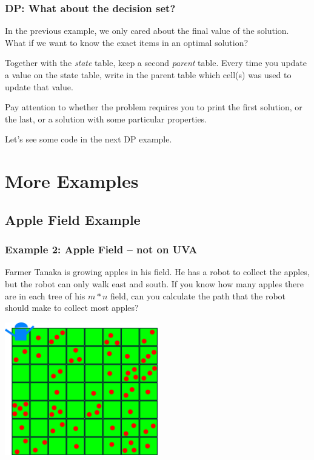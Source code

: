 \documentclass{beamer}
\begin{document}
\begin{frame}
  \frametitle{DP: What about the decision set?}  

  \begin{block}{}
  In the previous example, we only cared about the final value of the
  solution. What if we want to know the exact items in an optimal
  solution?
  \end{block}

  \medskip
  
  Together with the \emph{state} table, keep a second \emph{parent} table. 
  Every time you update a value on the state table, write in the parent table 
  which cell(s) was used to update that value.

  \medskip

  Pay attention to whether the problem requires you to print the first
  solution, or the last, or a solution with some particular
  properties.

  \bigskip

  Let's see some code in the next DP example.
\end{frame}



\section{More Examples}
\subsection{Apple Field Example}
\begin{frame}
  \frametitle{Example 2: Apple Field -- not on UVA}

  \begin{block}{}
  {\smaller
  Farmer Tanaka is growing apples in his field. He has a robot to collect the apples, but 
  the robot can only walk east and south. If you know how many apples there are in each 
  tree of his $m * n$ field, can you calculate the path that the robot should make to collect
  most apples?}
  \end{block}
  
  \begin{center}  
    \includegraphics[width=0.5\textwidth]{../img/applefield}
  \end{center}
\end{frame}
\end{document}
